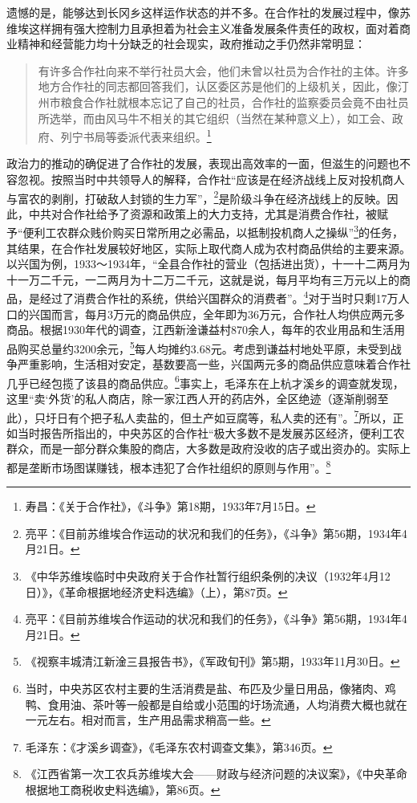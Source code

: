 遗憾的是，能够达到长冈乡这样运作状态的并不多。在合作社的发展过程中，像苏维埃这样拥有强大控制力且承担着为社会主义准备发展条件责任的政权，面对着商业精神和经营能力均十分缺乏的社会现实，政府推动之手仍然非常明显：

\begin{quote}

有许多合作社向来不举行社员大会，他们未曾以社员为合作社的主体。许多地方合作社的同志都回答我们，认区委区苏是他们的上级机关，因此，像汀州市粮食合作社就根本忘记了自己的社员，合作社的监察委员会竟不由社员所选举，而由风马牛不相关的其它组织（当然在某种意义上），如工会、政府、列宁书局等委派代表来组织。\footnote{寿昌：《关于合作社》，《斗争》第18期，1933年7月15日。}
\end{quote}


政治力的推动的确促进了合作社的发展，表现出高效率的一面，但滋生的问题也不容忽视。按照当时中共领导人的解释，合作社“应该是在经济战线上反对投机商人与富农的剥削，打破敌人封锁的生力军”，\footnote{亮平：《目前苏维埃合作运动的状况和我们的任务》，《斗争》第56期，1934年4月21日。}是阶级斗争在经济战线上的反映。因此，中共对合作社给予了资源和政策上的大力支持，尤其是消费合作社，被赋予“便利工农群众贱价购买日常所用之必需品，以抵制投机商人之操纵”\footnote{《中华苏维埃临时中央政府关于合作社暂行组织条例的决议（1932年4月12日）》，《革命根据地经济史料选编》（上），第87页。}的任务，其结果，在合作社发展较好地区，实际上取代商人成为农村商品供给的主要来源。以兴国为例，1933～1934年，“全县合作社的营业（包括进出货），十一十二两月为十一万二千元，一二两月为十二万二千元，这就是说，每月平均有三万元以上的商品，是经过了消费合作社的系统，供给兴国群众的消费者”。\footnote{亮平：《目前苏维埃合作运动的状况和我们的任务》，《斗争》第56期，1934年4月21日。}对于当时只剩17万人口的兴国而言，每月3万元的商品供应，全年即为36万元，合作社人均供应两元多商品。根据1930年代的调查，江西新淦谦益村870余人，每年的农业用品和生活用品购买总量约3200余元，\footnote{《视察丰城清江新淦三县报告书》，《军政旬刊》第5期，1933年11月30日。}每人均摊约3.68元。考虑到谦益村地处平原，未受到战争严重影响，生活相对安定，基数要高一些，兴国两元多的商品供应意味着合作社几乎已经包揽了该县的商品供应。\footnote{当时，中央苏区农村主要的生活消费是盐、布匹及少量日用品，像猪肉、鸡鸭、食用油、茶叶等一般都是自给或小范围的圩场流通，人均消费大概也就在一元左右。相对而言，生产用品需求稍高一些。}事实上，毛泽东在上杭才溪乡的调查就发现，这里“卖‘外货’的私人商店，除一家江西人开的药店外，全区绝迹（逐渐削弱至此），只圩日有个把子私人卖盐的，但土产如豆腐等，私人卖的还有”。\footnote{毛泽东：《才溪乡调查》，《毛泽东农村调查文集》，第346页。}所以，正如当时报告所指出的，中央苏区的合作社“极大多数不是发展苏区经济，便利工农群众，而是一部分群众集股的商店，大多数是政府没收的店子或出资办的。实际上都是垄断市场图谋赚钱，根本违犯了合作社组织的原则与作用”。\footnote{《江西省第一次工农兵苏维埃大会——财政与经济问题的决议案》，《中央革命根据地工商税收史料选编》，第86页。}



